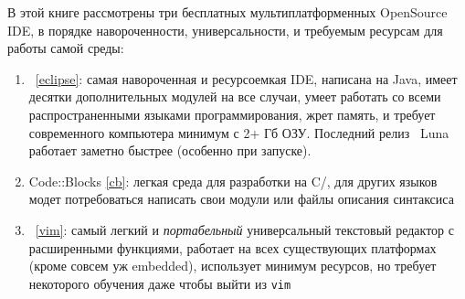 В этой книге рассмотрены три бесплатных мультиплатформенных OpenSource IDE, в
порядке навороченности, универсальности, и требуемым ресурсам для работы самой
среды:

\begin{enumerate}
  \item \eclipse\ \ref{eclipse}: самая навороченная и ресурсоемкая IDE, написана
  на Java, имеет десятки дополнительных модулей на все случаи, умеет работать со
  всеми распространенными языками программирования, жрет память, и требует
  современного компьютера минимум с 2+ Гб ОЗУ. Последний релиз \eclipse\ Luna
  работает заметно быстрее (особенно при запуске). 
  \item Code::Blocks \ref{cb}: легкая среда для разработки на C/\cpp, для других
  языков модет потребоваться написать свои модули или файлы описания синтаксиса
  \item \vim\ \ref{vim}: самый легкий и \emph{портабельный} универсальный
  текстовый редактор с расширенными функциями, работает на всех
  существующих платформах (кроме совсем уж embedded), использует минимум
  ресурсов, но требует некоторого обучения даже чтобы выйти из \verb|vim|
  \smiley
\end{enumerate}




